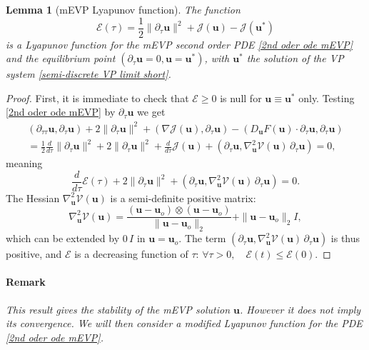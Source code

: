 \documentclass[11pt]{article}
\newtheorem{lemma}[theorem]{Lemma}
\newcommand{\bu}{\mathbf{u}}
\begin{document}
\begin{lemma}[mEVP Lyapunov function]The function
    \begin{equation}
        \mathcal E(\tau)=\frac12 \|\partial_\tau \bu \|^2+\mathcal J(\bu)-\mathcal J(\bu^*)
    \end{equation}is a Lyapunov function for the mEVP second order PDE \eqref{2nd oder ode mEVP} and the equilibrium point $(\partial_\tau \bu = 0, \bu = \bu^*)$, with $\bu^*$ the solution of the VP system \eqref{semi-discrete VP limit short}.
    \label{lemma: lyapunov fun}
\end{lemma}
\begin{proof}
First, it is immediate to check that $\mathcal{E}\ge 0$ is null for $\bu \equiv \bu^*$ only. 
Testing \eqref{2nd oder ode mEVP} by $\partial_\tau \bu$ we get
\begin{multline*}
(\partial_{\tau \tau} \bu, \partial_\tau \bu ) + 2 \|\partial_\tau \bu\|^2 + (\nabla \mathcal{J}(\bu), \partial_\tau \bu) - (D_{\bu}F(\bu)\cdot \partial_\tau \bu, \partial_\tau \bu) \\
    = \frac{1}{2} \frac{d}{d\tau} \|\partial_\tau \bu\|^2 + 2 \|\partial_\tau \bu\|^2 + \frac{d}{d\tau} \mathcal{J}(\bu) + (\partial_\tau \bu, \nabla^2_{\bu} \mathcal{V}(\bu)\, \partial_\tau \bu) = 0,
\end{multline*}
meaning
    \begin{equation}
        \frac{d}{d\tau} \mathcal{E}(\tau) + 2 \|\partial_\tau
\bu\|^2 + (\partial_\tau \bu, \nabla^2_{\bu} \mathcal{V}(\bu)\, \partial_\tau \bu) = 0.    
\end{equation} The Hessian $\nabla^2_{\bu} \mathcal{V}(\bu)$ is a semi-definite positive matrix:
$$\nabla^2_{\bu} \mathcal{V}(\bu) = \frac{(\bu-\bu_o) \otimes (\bu-\bu_o)}{\|\bu-\bu_o\|_2} + \|\bu-\bu_o\|_2 I,
$$which can be extended by $0 \, I$ in $\bu=\bu_o$. The term $(\partial_\tau \bu, \nabla^2_{\bu} \mathcal{V}(\bu)\, \partial_\tau \bu)$ is thus positive, and $\mathcal{E}$ is a decreasing function of $\tau$: $\forall \tau > 0, \quad \mathcal E(t)\leq \mathcal E(0).$
\end{proof}
\paragraph{Remark} \textit{This result gives the stability of the mEVP solution $\bu$. However it does not imply its convergence. We will then consider a modified Lyapunov function for the PDE \eqref{2nd oder ode mEVP}.}
\end{document}
